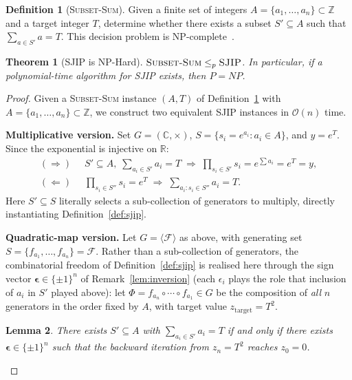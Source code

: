 \documentclass[journal,twocolumn]{IEEEtran}
\theoremstyle{definition}
\newtheorem{definition}{Definition}[section]
\theoremstyle{plain}
\newtheorem{theorem}{Theorem}[section]
\newtheorem{lemma}[theorem]{Lemma}
\newcommand{\C}{\mathbb{C}}
\newcommand{\R}{\mathbb{R}}
\newcommand{\Z}{\mathbb{Z}}
\begin{document}
\begin{definition}[\textsc{Subset-Sum}]
\label{def:subsetsum}
Given a finite set of integers $A = \{a_1,\ldots,a_n\}\subset\Z$ and
a target integer $T$, determine whether there exists a subset $S'
\subseteq A$ such that $\sum_{a\in S'} a = T$. This decision problem
is NP-complete~\cite{garey1979}.
\end{definition}

\begin{theorem}[SJIP is NP-Hard]
\label{thm:sjip_nphard}
$\textsc{Subset-Sum} \le_p \textsc{SJIP}$.  In particular,
if a polynomial-time algorithm for SJIP exists, then $P = NP$.
\end{theorem}

\begin{proof}
Given a \textsc{Subset-Sum} instance $(A, T)$ of
Definition~\ref{def:subsetsum} with
$A = \{a_1, \ldots, a_n\} \subset \Z$, we construct two equivalent
SJIP instances in $\mathcal{O}(n)$ time.

\medskip\noindent\textbf{Multiplicative version.}
Set $G = (\C, \times)$, $S = \{s_i = e^{a_i} : a_i \in A\}$,
and $y = e^T$.  Since the exponential is injective on $\R$:
\begin{align*}
  (\Rightarrow)\;&\;
  S' \subseteq A,\;\sum_{a_i \in S'} a_i = T
  \;\Longrightarrow\;
  \prod_{s_i \in S'} s_i = e^{\sum a_i} = e^T = y,\\
  (\Leftarrow)\;&\;
  \prod_{s_i \in S''} s_i = e^T
  \;\Longrightarrow\;
  \sum_{a_i : s_i \in S''} a_i = T.
\end{align*}
Here $S'\subseteq S$ literally selects a sub-collection of
generators to multiply, directly instantiating Definition~\ref{def:sjip}.

\medskip\noindent\textbf{Quadratic-map version.}
Let $G = \langle\mathcal{F}\rangle$ as above, with generating set
$S = \{f_{a_1}, \ldots, f_{a_n}\} = \mathcal F$.  Rather than a
sub-collection of generators, the combinatorial freedom of
Definition~\ref{def:sjip} is realised here through the sign vector
$\boldsymbol\epsilon\in\{\pm1\}^n$ of Remark~\ref{lem:inversion}
(each $\epsilon_i$ plays the role that inclusion of $a_i$ in $S'$
played above): let $\Phi = f_{a_n}\circ\cdots\circ f_{a_1}\in G$ be
the composition of \emph{all} $n$ generators in the order fixed by
$A$, with target value $z_{\mathrm{target}} = T^2$.

\begin{lemma}
\label{lem:main_iff}
There exists $S' \subseteq A$ with $\sum_{a_i \in S'} a_i = T$ if
and only if there exists $\boldsymbol\epsilon \in \{\pm1\}^n$ such
that the backward iteration from $z_n = T^2$ reaches $z_0 = 0$.
\end{lemma}


\end{proof}
\end{document}
